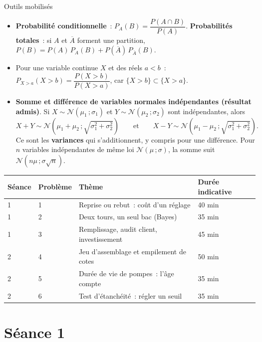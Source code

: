 \documentclass[a4paper,11pt]{article}
\begin{document}
\begin{rappel}{Outils mobilisés}
\begin{itemize}[leftmargin=12pt, itemsep=2pt, topsep=2pt]
  \item \textbf{Probabilité conditionnelle}~: $P_A(B) = \dfrac{P(A\cap B)}{P(A)}$. \textbf{Probabilités totales}~: si $A$ et $\overline{A}$ forment une partition, $P(B) = P(A)\,P_A(B) + P(\overline{A})\,P_{\overline{A}}(B)$.
  \item Pour une variable continue $X$ et des réels $a < b$~: $P_{X > a}(X > b) = \dfrac{P(X > b)}{P(X > a)}$, car $\{X > b\} \subset \{X > a\}$.
  \item \textbf{Somme et différence de variables normales indépendantes (résultat admis)}. Si $X \sim \mathcal{N}(\mu_1\,;\sigma_1)$ et $Y \sim \mathcal{N}(\mu_2\,;\sigma_2)$ sont indépendantes, alors
  \[
  X + Y \sim \mathcal{N}\!\left(\mu_1 + \mu_2\,;\sqrt{\sigma_1^2 + \sigma_2^2}\right)
  \qquad\text{et}\qquad
  X - Y \sim \mathcal{N}\!\left(\mu_1 - \mu_2\,;\sqrt{\sigma_1^2 + \sigma_2^2}\right).
  \]
  Ce sont les \textbf{variances} qui s'additionnent, y compris pour une différence. Pour $n$ variables indépendantes de même loi $\mathcal{N}(\mu\,;\sigma)$, la somme suit $\mathcal{N}(n\mu\,;\sigma\sqrt{n})$.
\end{itemize}
\end{rappel}

\begin{center}
\small
\begin{tabular}{llll}
\toprule
\textbf{Séance} & \textbf{Problème} & \textbf{Thème} & \textbf{Durée indicative} \\
\midrule
1 & 1 & Reprise ou rebut~: coût d'un réglage & 40 min \\
1 & 2 & Deux tours, un seul bac (Bayes) & 35 min \\
1 & 3 & Remplissage, audit client, investissement & 45 min \\
\midrule
2 & 4 & Jeu d'assemblage et empilement de cotes & 50 min \\
2 & 5 & Durée de vie de pompes~: l'âge compte & 35 min \\
2 & 6 & Test d'étanchéité~: régler un seuil & 35 min \\
\bottomrule
\end{tabular}
\end{center}

\newpage
\section{Séance 1}
\end{document}
